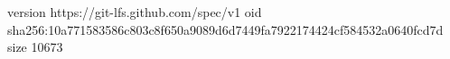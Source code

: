 version https://git-lfs.github.com/spec/v1
oid sha256:10a771583586c803c8f650a9089d6d7449fa7922174424cf584532a0640fcd7d
size 10673

